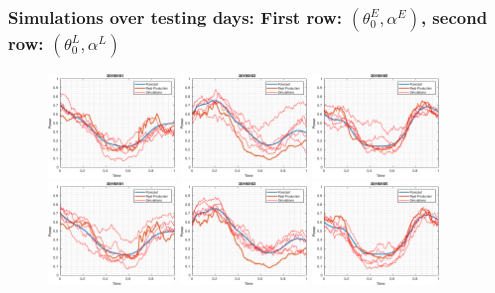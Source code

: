 \documentclass[aspectratio=169]{beamer}\usepackage[utf8]{inputenc}
\begin{document}

\begin{frame}\frametitle{Simulations over testing days: First row: $(\theta_0^E,\alpha^E)$, second row: $(\theta_0^L,\alpha^L)$}

\begin{figure}[ht!]
\centering
\includegraphics[width=0.3\textwidth]{../../MATLAB_Files/Results/paths_testing_days/optimal_value/1.eps}
\includegraphics[width=0.3\textwidth]{../../MATLAB_Files/Results/paths_testing_days/optimal_value/2.eps}
\includegraphics[width=0.3\textwidth]{../../MATLAB_Files/Results/paths_testing_days/optimal_value/3.eps}
\includegraphics[width=0.3\textwidth]{../../MATLAB_Files/Results/paths_testing_days/Optimal_Lamperti/1.eps}
\includegraphics[width=0.3\textwidth]{../../MATLAB_Files/Results/paths_testing_days/Optimal_Lamperti/2.eps}
\includegraphics[width=0.3\textwidth]{../../MATLAB_Files/Results/paths_testing_days/Optimal_Lamperti/3.eps}
\end{figure}

\end{frame}
\end{document}
